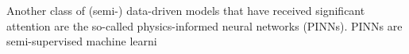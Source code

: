Another class of (semi-) data-driven models that have received significant attention are the so-called physics-informed neural networks (PINNs). PINNs are semi-supervised machine learni  
